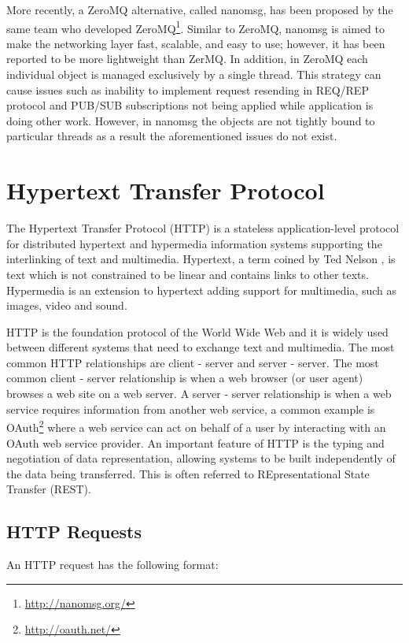 \documentclass[a4paper,11pt,twoside]{report}
\begin{document}
More recently, a ZeroMQ alternative, called nanomsg, has been proposed by the same team who developed ZeroMQ\footnote{\label{nanomsg} \url{http://nanomsg.org/}}. Similar to ZeroMQ, nanomsg is aimed to make the networking layer fast, scalable, and easy to use; however, it has been reported to be more lightweight than ZerMQ. In addition, in ZeroMQ each individual object is managed exclusively by a single thread. This strategy can cause issues such as inability to implement request resending in REQ/REP protocol and PUB/SUB subscriptions not being applied while application is doing other work. However, in nanomsg the objects are not tightly bound to particular threads as a result the aforementioned issues do not exist. 


\section{Hypertext Transfer Protocol} \label{HTTP}
The Hypertext Transfer Protocol (HTTP) is a stateless application-level protocol for distributed hypertext and hypermedia information systems supporting the interlinking of text and multimedia.  Hypertext, a term coined by Ted Nelson \cite{hypertext}, is text which is not constrained to be linear and contains links to other texts.  Hypermedia is an extension to hypertext adding support for multimedia, such as images, video and sound.

HTTP is the foundation protocol of the World Wide Web and it is widely used between different systems that need to exchange text and multimedia.  The most common HTTP relationships are client - server and server - server.  The most common client - server relationship is when a web browser (or user agent) browses a web site on a web server.  A server - server relationship is when a web service requires information from another web service, a common example is OAuth\footnote{\label{OAuth} \url{http://oauth.net/}} where a web service can act on behalf of a user by interacting with an OAuth web service provider.  An important feature of HTTP is the typing and negotiation of data representation, allowing systems to be built independently of the data being transferred. This is often referred to REpresentational State Transfer (REST).

\subsection{HTTP Requests} \label{Requests}
An HTTP request has the following format:\bigskip
\end{document}
